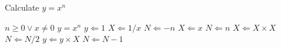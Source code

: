 \begin{algorithm}
\caption{Calculate $y = x^n$}
\label{alg1}
\begin{multicols}{2}
\begin{algorithmic}[1]
  \REQUIRE $n \geq 0 \vee x \neq 0$
  \ENSURE $y = x^n$
  \STATE $y \Leftarrow 1$
  \STATE $X \Leftarrow 1 / x$
  \STATE $N \Leftarrow -n$
  \ELSE
  \STATE $X \Leftarrow x$
  \STATE $N \Leftarrow n$
  \ENDIF
  \STATE $X \Leftarrow X \times X$
  \STATE $N \Leftarrow N / 2$
  \ELSE [$N$ is odd]
  \STATE $y \Leftarrow y \times X$
  \STATE $N \Leftarrow N - 1$
  \ENDIF
  \ENDWHILE
\end{algorithmic}
\end{multicols}
\end{algorithm}

